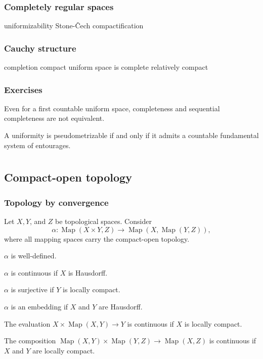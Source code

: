 \documentclass{../../large}
\DeclareMathOperator{\Map}{Map}
\begin{document}
\section{Completely regular spaces}
uniformizability
Stone-\v Cech compactification

\section{Cauchy structure}
completion
compact uniform space is complete
relatively compact

\section*{Exercises}
\begin{prb}
Even for a first countable uniform space, completeness and sequential completeness are not equivalent.
\end{prb}
\begin{prb}
A uniformity is pseudometrizable if and only if it admits a countable fundamental system of entourages.
\end{prb}



\chapter{}



\part{}





\chapter{Compact-open topology}

\section{Topology by convergence}

\begin{prb}
Let $X,Y$, and $Z$ be topological spaces.
Consider
\[\alpha:\Map(X\times Y,Z)\to\Map(X,\Map(Y,Z)),\]
where all mapping spaces carry the compact-open topology.
\begin{parts}
\item $\alpha$ is well-defined.
\item $\alpha$ is continuous if $X$ is Hausdorff.
\item $\alpha$ is surjective if $Y$ is locally compact.
\item $\alpha$ is an embedding if $X$ and $Y$ are Hausdorff.
\item The evaluation $X\times\Map(X,Y)\to Y$ is continuous if $X$ is locally compact.
\item The composition $\Map(X,Y)\times\Map(Y,Z)\to\Map(X,Z)$ is continuous if $X$ and $Y$ are locally compact.
\end{parts}
\end{prb}
\end{document}

